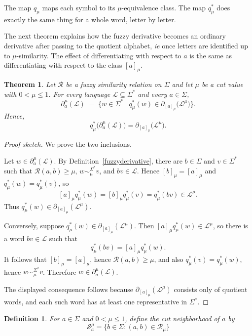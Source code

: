 \documentclass{article}
\newcommand{\cR}{{\mathcal R}}
\def\cut{\mu}
\newtheorem{definition}{Definition}[section]
\newtheorem{theorem}{Theorem}[section]
\begin{document}
\noindent
The map $q_\cut$ maps each symbol to its $\cut$-equivalence class. The map
$q_\cut^*$ does exactly the same thing for a whole word, letter by letter.

The next theorem explains how the fuzzy derivative becomes an ordinary derivative
after passing to the quotient alphabet, {\em ie}  once letters are identified up to
$\cut$-similarity. The effect of differentiating with respect to $a$ is the same as
differentiating with respect to the class $[a]_\cut$.

\begin{theorem}\label{the:quotient-fuzzy-derivative}
Let $\cR$ be a fuzzy similarity relation on $\Sigma$ and let $\cut$ be a cut value
with $0 < \cut \le 1$. For every language $\mathcal L \subseteq \Sigma^*$ and every
$a\in\Sigma$,
\[
  \partial_a^\cut(\mathcal L)
  \;=\;
  \{w\in\Sigma^* \mid q_\cut^*(w)\in
       \partial_{[a]_\cut}\bigl(\mathcal L^\cut\bigr)\}.
\]
Hence,
\[
  q_\cut^*\bigl(\partial_a^\cut(\mathcal L)\bigr)
  =
  \partial_{[a]_\cut}\bigl(\mathcal L^\cut\bigr).
\]
\end{theorem}

\begin{proof}[Proof sketch]
We prove the two inclusions.

Let $w\in\partial_a^\cut(\mathcal L)$. By Definition~\ref{fuzzyderivative},
there are $b\in\Sigma$ and $v\in\Sigma^*$ such that $\cR(a,b)\ge\cut$,
$w\sim_\cut^{\Sigma^*}v$, and $bv\in\mathcal L$. Hence
$[b]_\cut=[a]_\cut$ and $q_\cut^*(w)=q_\cut^*(v)$, so
\[
  [a]_\cut q_\cut^*(w)
  =
  [b]_\cut q_\cut^*(v)
  =
  q_\cut^*(bv)
  \in \mathcal L^\cut.
\]
Thus $q_\cut^*(w)\in\partial_{[a]_\cut}(\mathcal L^\cut)$.

Conversely, suppose $q_\cut^*(w)\in\partial_{[a]_\cut}(\mathcal L^\cut)$. Then
$[a]_\cut q_\cut^*(w)\in\mathcal L^\cut$, so there is a word $bv\in\mathcal L$
such that
\[
  q_\cut^*(bv)=[a]_\cut q_\cut^*(w).
\]
It follows that $[b]_\cut=[a]_\cut$, hence $\cR(a,b)\ge\cut$, and also
$q_\cut^*(v)=q_\cut^*(w)$, hence $w\sim_\cut^{\Sigma^*}v$. Therefore
$w\in\partial_a^\cut(\mathcal L)$.

The displayed consequence follows because
$\partial_{[a]_\cut}(\mathcal L^\cut)$ consists only of quotient words, and each
such word has at least one representative in $\Sigma^*$.
\end{proof}


\begin{definition}\label{def:cut-neighborhood}
    For $a\in\Sigma$ and $0<\cut\le 1$, define the cut neighborhood of $a$ by
    $$
        \mathcal{S}^\cut_a = \{b \in\Sigma :  (a,b)\in\mathcal{R}_\cut\}
    $$
\end{definition}
\end{document}

